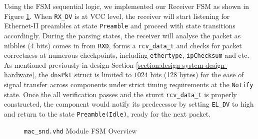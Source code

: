 \documentclass[a4paper]{report}
\newcommand{\code}{\texttt}
\begin{document}
Using the FSM sequential logic, we implemented our Receiver FSM as shown in Figure \ref{fig:rcv-fsm}. When \code{RX\_DV} is at VCC level, the receiver will start listening for Ethernet-II preambles at state \code{Preamble} and proceed with state transitions accordingly. During the parsing states, the receiver will analyse the packet as nibbles (4 bits) comes in from \code{RXD}, forms a \code{rcv\_data\_t} and checks for packet correctness at numerous checkpoints, including \code{ethertype}, \code{ipChecksum} and etc. As mentioned previously in design Section \ref{section:design-system-design-hardware}, the \code{dnsPkt} struct is limited to $1024$ bits (128 bytes) for the ease of signal transfer across components under strict timing requirements at the \code{Notify} state. Once the all verification passes and the sturct \code{rcv\_data\_t} is properly constructed, the component would notify its predecessor by setting \code{EL\_DV} to high and return to the state \code{Preamble(Idle)}, ready for the next packet.

\begin{figure}[h!]
  \caption{\code{mac\_snd.vhd} Module FSM Overview}
  \label{fig:rcv-fsm}
\end{figure}
\end{document}
